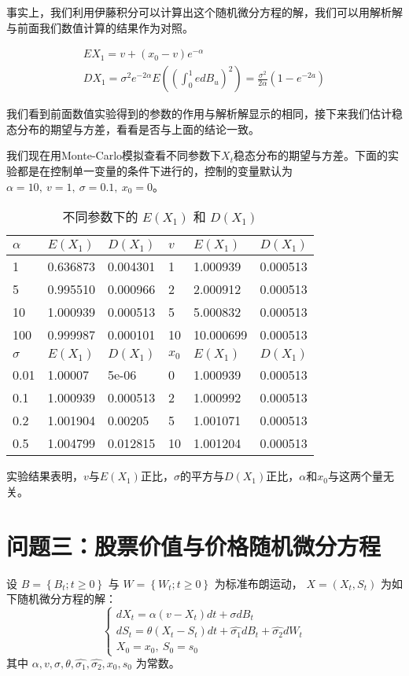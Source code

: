 \documentclass{article}
\begin{document}
事实上，我们利用伊藤积分可以计算出这个随机微分方程的解，我们可以用解析解与前面我们数值计算的结果作为对照。

$$
\begin{array}{l}
EX_1 = v + (x_0 - v)e^{-\alpha} \\
DX_1 = \sigma^2 e^{-2\alpha} E((\int_0^1 e dB_u)^2) = \frac{\sigma^2}{2\alpha}(1-e^{-2a})
\end{array}
$$

我们看到前面数值实验得到的参数的作用与解析解显示的相同，接下来我们估计稳态分布的期望与方差，看看是否与上面的结论一致。

我们现在用Monte-Carlo模拟查看不同参数下$X_t$稳态分布的期望与方差。下面的实验都是在控制单一变量的条件下进行的，控制的变量默认为 $\alpha = 10, \ v=1,\ \sigma=0.1 , \ x_0 = 0$。

\begin{table}[H]
    \centering
    \caption{不同参数下的 $E(X_1)$ 和 $D(X_1)$}
    \begin{tabular}{l|l|l|l|l|l}
    \hline
    $\alpha$ & $E(X_1)$ & $D(X_1)$ & $v$    & $E(X_1)$ & $D(X_1)$ \\ \hline
    1     & 0.636873 & 0.004301 & 1    & 1.000939  & 0.000513 \\
    5     & 0.995510 & 0.000966 & 2    & 2.000912  & 0.000513 \\
    10     & 1.000939  & 0.000513 & 5    & 5.000832  & 0.000513 \\
    100    & 0.999987 & 0.000101 & 10   & 10.000699 & 0.000513 \\ \hline 
    $\sigma$ & $E(X_1)$ & $D(X_1)$ & $x_0$ & $E(X_1)$ & $D(X_1)$ \\ \hline
    0.01   & 1.00007  & 5e-06    & 0    & 1.000939  & 0.000513 \\
    0.1   & 1.000939 & 0.000513 & 2    & 1.000992  & 0.000513 \\
    0.2   & 1.001904 & 0.00205  & 5    & 1.001071  & 0.000513 \\
    0.5   & 1.004799 & 0.012815 & 10   & 1.001204  & 0.000513 \\ \hline
    \end{tabular}
\end{table}


    
实验结果表明，$v$与$E(X_1)$正比，$\sigma$的平方与$D(X_1)$正比，$\alpha$和$x_0$与这两个量无关。




\section{问题三：股票价值与价格随机微分方程}
设 $B=\left\{B_{t} ; t \geq 0\right\}$ 与 $W=\left\{W_{t} ; t \geq 0\right\}$ 为标准布朗运动， $X=\left(X_{t} , S_t\right)$ 为如下随机微分方程的解：
$$
\left\{\begin{array}{l}
d X_{t}=\alpha\left(v-X_{t}\right) d t+\sigma d B_{t} \\
d S_{t} = \theta \left(X_{t}-S_{t}\right) d t+\hat{\sigma_1} dB_t + \hat{\sigma_2} dW_t\\
X_{0}=x_{0}, \ S_0 = s_0
\end{array}\right.
$$
其中 $\alpha, v, \sigma, \theta, \hat{\sigma_1}, \hat{\sigma_2}, x_{0}, s_0$ 为常数。
\end{document}
